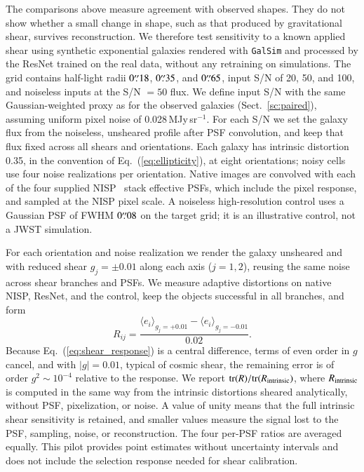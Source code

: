 \documentclass[longauth]{aa}
\begin{document}
The comparisons above measure agreement with observed shapes.
They do not show whether a small change in shape, such as that produced by gravitational shear, survives reconstruction.
We therefore test sensitivity to a known applied shear using synthetic exponential galaxies rendered with \texttt{GalSim} and processed by the ResNet trained on the real data, without any retraining on simulations.
The grid contains half-light radii $0\overset{\prime\prime}{.}18$, $0\overset{\prime\prime}{.}35$, and $0\overset{\prime\prime}{.}65$, input S/N of 20, 50, and 100, and noiseless inputs at the S/N $=50$ flux.
We define input S/N with the same Gaussian-weighted proxy as for the observed galaxies (Sect.~\ref{sc:paired}), assuming uniform pixel noise of 0.028\,MJy\,sr$^{-1}$.
For each S/N we set the galaxy flux from the noiseless, unsheared profile after PSF convolution, and keep that flux fixed across all shears and orientations.
Each galaxy has intrinsic distortion 0.35, in the convention of Eq.~(\ref{eq:ellipticity}), at eight orientations; noisy cells use four noise realizations per orientation.
Native images are convolved with each of the four supplied NISP \YE\ stack effective PSFs, which include the pixel response, and sampled at the NISP pixel scale.
A noiseless high-resolution control uses a Gaussian PSF of FWHM $0\overset{\prime\prime}{.}08$ on the target grid; it is an illustrative control, not a JWST simulation.

For each orientation and noise realization we render the galaxy unsheared and with reduced shear $g_j=\pm0.01$ along each axis ($j=1,2$), reusing the same noise across shear branches and PSFs.
We measure adaptive distortions on native NISP, ResNet, and the control, keep the objects successful in all branches, and form
\begin{equation}
 R_{ij}=\frac{\langle e_i\rangle_{g_j=+0.01}-\langle e_i\rangle_{g_j=-0.01}}{0.02}.
 \label{eq:shear_response}
\end{equation}
Because Eq.~(\ref{eq:shear_response}) is a central difference, terms of even order in $g$ cancel, and with $|g|=0.01$, typical of cosmic shear, the remaining error is of order $g^2\sim10^{-4}$ relative to the response.
We report $\mathrm{tr}(R)/\mathrm{tr}(R_{\rm intrinsic})$, where $R_{\rm intrinsic}$ is computed in the same way from the intrinsic distortions sheared analytically, without PSF, pixelization, or noise.
A value of unity means that the full intrinsic shear sensitivity is retained, and smaller values measure the signal lost to the PSF, sampling, noise, or reconstruction.
The four per-PSF ratios are averaged equally.
This pilot provides point estimates without uncertainty intervals and does not include the selection response needed for shear calibration.
\end{document}
